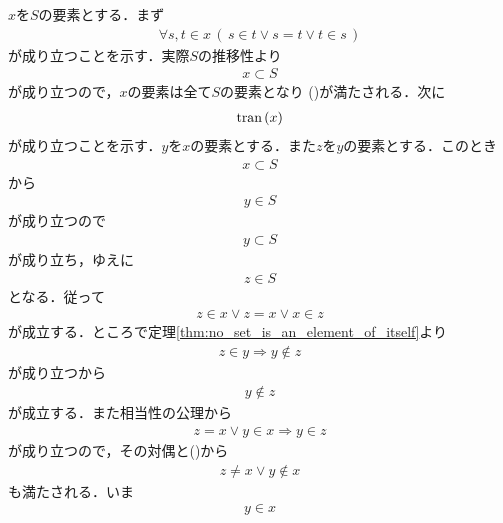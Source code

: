 	\begin{sketch}
		$x$を$S$の要素とする．まず
		\begin{align}
			\forall s,t \in x\, (\, s \in t \vee s = t \vee t \in s\, )
			\label{fom:thm_transitive_totally_ordered_class_is_contained_in_ON_1}
		\end{align}
		が成り立つことを示す．実際$S$の推移性より
		\begin{align}
			x \subset S
		\end{align}
		が成り立つので，$x$の要素は全て$S$の要素となり
		()が満たされる．次に
		\begin{align}
			\operatorname*{tran}\hspace{0.15em}(x)
		\end{align}
		が成り立つことを示す．$y$を$x$の要素とする．また$z$を$y$の要素とする．このとき
		\begin{align}
			x \subset S
		\end{align}
		から
		\begin{align}
			y \in S
		\end{align}
		が成り立つので
		\begin{align}
			y \subset S
		\end{align}
		が成り立ち，ゆえに
		\begin{align}
			z \in S
		\end{align}
		となる．従って
		\begin{align}
			z \in x \vee z = x \vee x \in z
			\label{fom:thm_transitive_totally_ordered_class_is_contained_in_ON_2}
		\end{align}
		が成立する．ところで定理\ref{thm:no_set_is_an_element_of_itself}より
		\begin{align}
			z \in y \Longrightarrow y \notin z
		\end{align}
		が成り立つから
		\begin{align}
			y \notin z
			\label{fom:thm_transitive_totally_ordered_class_is_contained_in_ON_3}
		\end{align}
		が成立する．また相当性の公理から
		\begin{align}
			z = x \vee y \in x \Longrightarrow y \in z
		\end{align}
		が成り立つので，その対偶と()から
		\begin{align}
			z \neq x \vee y \notin x
		\end{align}
		も満たされる．いま
		\begin{align}
			y \in x
		\end{align}

\end{sketch}
